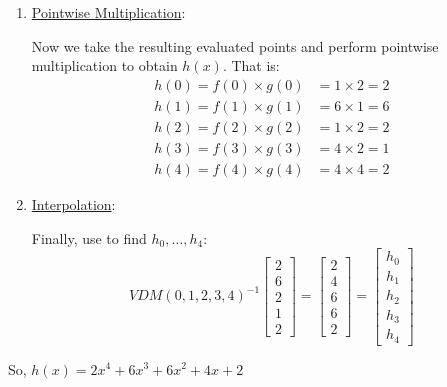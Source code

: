 \begin{example}{}{}
\begin{enumerate}
        \item \ul{Pointwise Multiplication}:

        Now we take the resulting evaluated points and perform pointwise multiplication to obtain $h(x)$.
        That is:
        \begin{align*}
            h(0) = f(0) \times g(0) &= 1 \times 2 = 2 \\
            h(1) = f(1) \times g(1) &= 6 \times 1 = 6 \\ 
            h(2) = f(2) \times g(2) &= 1 \times 2 = 2 \\
            h(3) = f(3) \times g(3) &= 4 \times 2 = 1 \\
            h(4) = f(4) \times g(4) &= 4 \times 4 = 2
        \end{align*}

        \item \ul{Interpolation}:
        
        Finally, use  to find $h_0, \ldots, h_4$:
        \begin{equation*}
            VDM(0,1,2,3,4)^{-1}
            \begin{bmatrix}
                2 \\ 6 \\ 2 \\ 1 \\ 2
            \end{bmatrix}
            = 
            \begin{bmatrix}
                2 \\ 4 \\ 6 \\ 6 \\ 2
            \end{bmatrix}
            = 
            \begin{bmatrix}
                h_0 \\ h_1 \\ h_2 \\ h_3 \\ h_4
            \end{bmatrix}
        \end{equation*}
    \end{enumerate}

    So, $h(x) = 2x^4 + 6x^3 + 6x^2 + 4x + 2$
\end{example}

